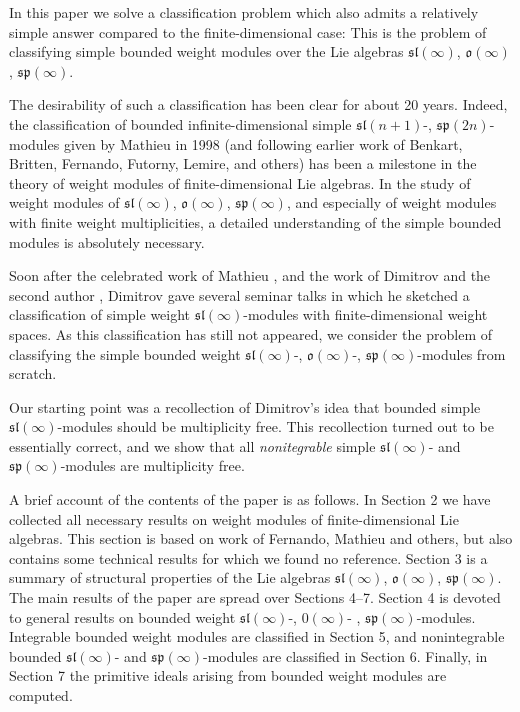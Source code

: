 \documentclass[12pt]{amsart}
\begin{document}
In this paper we solve a classification problem which also admits a relatively simple answer compared to the finite-dimensional case: This is the problem of classifying simple bounded weight modules over the Lie algebras $\mathfrak{sl}(\infty)$, $\mathfrak{o}(\infty)$, $\mathfrak{sp}(\infty)$.

The desirability of such a classification has been clear for about 20 years. Indeed, the classification of bounded infinite-dimensional simple ${\mathfrak{sl}(n+1)}$-, ${\mathfrak{sp}(2n)}$-modules given by Mathieu in 1998 (and following earlier work of Benkart, Britten, Fernando, Futorny, Lemire,  and others) has  been  a milestone in the theory of weight modules of finite-dimensional Lie algebras. In the study of weight modules of ${\mathfrak{sl}(\infty)}$, ${\mathfrak{o}(\infty)}$, ${\mathfrak{sp}(\infty)}$, and especially of weight modules with finite weight multiplicities, a detailed understanding of the simple bounded modules is absolutely necessary.

 Soon after the celebrated work of Mathieu \cite{M}, and the work of Dimitrov and the second author \cite{DP}, Dimitrov gave several seminar talks in which he sketched a classification of simple weight $\mathfrak{sl}(\infty)$-modules with finite-dimensional weight spaces. As  this classification has still not appeared,  we consider the problem of classifying  the simple  bounded weight $\mathfrak{sl}(\infty)$-, $\mathfrak{o}(\infty)$-, $\mathfrak{sp}(\infty)$-modules from scratch. 

 Our starting point was a recollection of  Dimitrov's idea that bounded simple $\mathfrak{sl}(\infty)$-modules should be multiplicity free. This recollection turned out  to be essentially correct, and we show that all \emph{nonitegrable} simple $\mathfrak{sl}(\infty)$-  and $\mathfrak{sp}(\infty)$-modules are multiplicity free.


A brief account of the contents of the paper is as follows. In Section 2 we have collected  all necessary results on weight modules of finite-dimensional Lie algebras. This section is based on work  of Fernando, Mathieu and others, but also contains some technical results for which we found no reference. Section 3 is a summary of structural properties  of the Lie algebras $\mathfrak{sl}(\infty)$, $\mathfrak{o}(\infty)$, $\mathfrak{sp}(\infty)$. The main results of the paper are spread over Sections 4--7. Section 4 is devoted to general results on bounded weight  $\mathfrak{sl}(\infty)$-,  $\mathfrak{0}(\infty)$- ,  $\mathfrak{sp}(\infty)$-modules. Integrable  bounded weight modules are classified in Section 5, and nonintegrable bounded $\mathfrak{sl}(\infty)$- and $\mathfrak{sp}(\infty)$-modules are classified in Section 6. Finally, in Section 7 the primitive ideals arising from bounded weight modules are computed.
\end{document}
